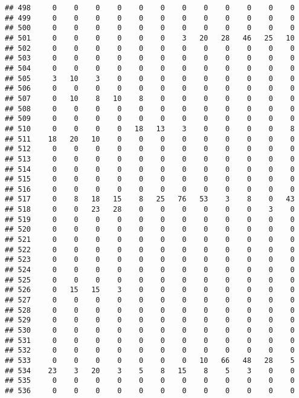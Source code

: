 \documentclass[]{article}
\begin{document}
\begin{verbatim}
## 498     0    0    0    0    0    0    0    0    0    0    0    0
## 499     0    0    0    0    0    0    0    0    0    0    0    0
## 500     0    0    0    0    0    0    0    0    0    0    0    0
## 501     0    0    0    0    0    0    3   20   28   46   25   10
## 502     0    0    0    0    0    0    0    0    0    0    0    0
## 503     0    0    0    0    0    0    0    0    0    0    0    0
## 504     0    0    0    0    0    0    0    0    0    0    0    0
## 505     3   10    3    0    0    0    0    0    0    0    0    0
## 506     0    0    0    0    0    0    0    0    0    0    0    0
## 507     0   10    8   10    8    0    0    0    0    0    0    0
## 508     0    0    0    0    0    0    0    0    0    0    0    0
## 509     0    0    0    0    0    0    0    0    0    0    0    0
## 510     0    0    0    0   18   13    3    0    0    0    0    8
## 511    18   20   10    0    0    0    0    0    0    0    0    0
## 512     0    0    0    0    0    0    0    0    0    0    0    0
## 513     0    0    0    0    0    0    0    0    0    0    0    0
## 514     0    0    0    0    0    0    0    0    0    0    0    0
## 515     0    0    0    0    0    0    0    0    0    0    0    0
## 516     0    0    0    0    0    0    0    0    0    0    0    0
## 517     0    8   18   15    8   25   76   53    3    8    0   43
## 518     0    0   23   28    0    0    0    0    0    0    3    0
## 519     0    0    0    0    0    0    0    0    0    0    0    0
## 520     0    0    0    0    0    0    0    0    0    0    0    0
## 521     0    0    0    0    0    0    0    0    0    0    0    0
## 522     0    0    0    0    0    0    0    0    0    0    0    0
## 523     0    0    0    0    0    0    0    0    0    0    0    0
## 524     0    0    0    0    0    0    0    0    0    0    0    0
## 525     0    0    0    0    0    0    0    0    0    0    0    0
## 526     0   15   15    3    0    0    0    0    0    0    0    0
## 527     0    0    0    0    0    0    0    0    0    0    0    0
## 528     0    0    0    0    0    0    0    0    0    0    0    0
## 529     0    0    0    0    0    0    0    0    0    0    0    0
## 530     0    0    0    0    0    0    0    0    0    0    0    0
## 531     0    0    0    0    0    0    0    0    0    0    0    0
## 532     0    0    0    0    0    0    0    0    0    0    0    0
## 533     0    0    0    0    0    0    0   10   66   48   28    5
## 534    23    3   20    3    5    8   15    8    5    3    0    0
## 535     0    0    0    0    0    0    0    0    0    0    0    0
## 536     0    0    0    0    0    0    0    0    0    0    0    0

\end{verbatim}
\end{document}
